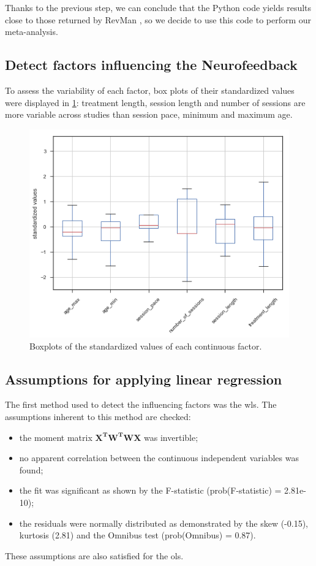 \documentclass[12pt,a4paper,english]{article}
\begin{document}
Thanks to the previous step, we can conclude that the Python code yields results close to those returned by RevMan \citet{RevMan}, so we decide to
use this code to perform our meta-analysis.		

\subsection{Detect factors influencing the Neurofeedback}
		
To assess the variability of each factor, box plots of their standardized values were displayed in \cref{Figure:factors_analysis_boxplots}: treatment length, 
session length and number of sessions are more variable across studies than session pace, minimum and maximum age.  

\begin{figure}[h!]
	\center
  \includegraphics[scale=0.5]{figures/factors_analysis_boxplot_no_colors_no_two_columns}
  \caption{Boxplots of the standardized values of each continuous factor.}
  \label{Figure:factors_analysis_boxplots}
\end{figure}

\subsection{Assumptions for applying linear regression}

The first method used to detect the influencing factors was the \gls{wls}. The assumptions inherent to this method are checked: 
\begin{itemize}
	\item the moment matrix $\mathbf{{X}^{T}W^{T}WX}$ was invertible;
  \item no apparent correlation between the continuous independent variables was found; 
  \item the fit was significant as shown by the F-statistic (prob(F-statistic) = 2.81e-10); 
  \item the residuals were normally distributed as demonstrated by the skew (-0.15), kurtosis (2.81) and the Omnibus test (prob(Omnibus) = 0.87).
\end{itemize} 

These assumptions are also satisfied for the \gls{ols}.

\clearpage


\end{document}

